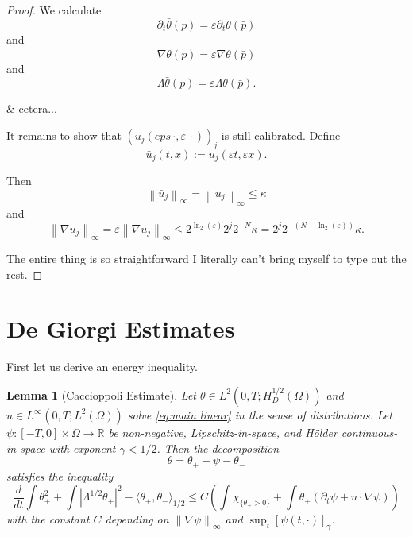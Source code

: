 \documentclass[11pt]{amsart}
\newtheorem{lemma}[theorem]{Lemma}
\theoremstyle{remark}
\theoremstyle{definition}
\newcommand{\R}{\mathbb{R}}
\newcommand{\eps}{\varepsilon}
\newcommand{\chevron}[1]{\langle #1 \rangle}
\newcommand{\norm}[1]{\left\lVert#1\right\rVert}
\newcommand{\paren}[1]{\left( #1 \right)}
\newcommand{\bracket}[1]{\left[ #1 \right]}
\newcommand{\abs}[1]{\left\lvert #1 \right\rvert}
\newcommand{\del}{\partial}
\newcommand{\grad}{\nabla}
\newcommand{\ddt}{\frac{d}{dt}}
\newcommand{\indic}[1]{\chi_{\{#1\}}}
\begin{document}
\begin{proof}
We calculate
\[ \del_t \bar{\theta}(p) = \eps \del_t \theta(\bar{p}) \]
and 
\[ \grad \bar{\theta}(p) = \eps \grad \theta(\bar{p}) \]
and
\[ \Lambda \bar{\theta}(p) = \eps \Lambda \theta(\bar{p}). \]

\& cetera...

It remains to show that $(u_j(eps\,\cdot, \eps\,\cdot))_j$ is still calibrated.  Define
\[ \bar{u}_j(t,x) := u_j(\eps t, \eps x). \]

Then
\[ \norm{\bar{u}_j}_\infty = \norm{u_j}_\infty \leq \kappa \]
and
\[ \norm{\grad \bar{u}_j}_\infty = \eps \norm{\grad u_j}_\infty \leq 2^{\ln_2(\eps)} 2^j 2^{-N} \kappa = 2^j 2^{-(N-\ln_2(\eps))} \kappa. \]

The entire thing is so straightforward I literally can't bring myself to type out the rest.  

\end{proof}




\section{De Giorgi Estimates} \label{sec:de giorgi}

First let us derive an energy inequality.  

\begin{lemma}[Caccioppoli Estimate] \label{thm:caccioppoli}
Let $\theta \in L^2(0,T; H_D^{1/2}(\Omega))$ and $u \in L^\infty(0,T; L^2(\Omega))$ solve \eqref{eq:main linear} in the sense of distributions.  Let $\psi: [-T,0]\times \Omega \to \R$ be non-negative, Lipschitz-in-space, and H\"{o}lder continuous-in-space with exponent $\gamma < 1/2$.  Then the decomposition
\[ \theta = \theta_+ + \psi - \theta_- \]
satisfies the inequality
\[ \ddt \int \theta_+^2 + \int \abs{\Lambda^{1/2} \theta_+}^2 - \chevron{\theta_+,\theta_-}_{1/2} \leq C \paren{ \int \indic{\theta_+ > 0} + \int \theta_+ (\del_t \psi + u\cdot\grad\psi) } \]
with the constant $C$ depending on $\norm{\grad \psi}_\infty$ and $\sup_t \bracket{\psi(t,\cdot)}_\gamma$.  

\end{lemma}
\end{document}
